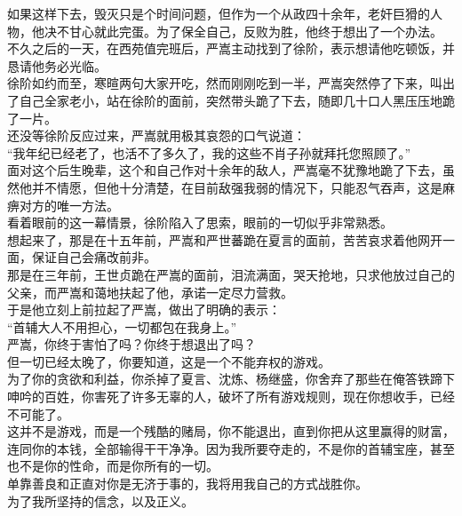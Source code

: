 \begin{multicols}{\theparacolNo}
如果这样下去，毁灭只是个时间问题，但作为一个从政四十余年，老奸巨猾的人物，他决不甘心就此完蛋。为了保全自己，反败为胜，他终于想出了一个办法。\\

不久之后的一天，在西苑值完班后，严嵩主动找到了徐阶，表示想请他吃顿饭，并恳请他务必光临。\\

徐阶如约而至，寒暄两句大家开吃，然而刚刚吃到一半，严嵩突然停了下来，叫出了自己全家老小，站在徐阶的面前，突然带头跪了下去，随即几十口人黑压压地跪了一片。\\

还没等徐阶反应过来，严嵩就用极其哀怨的口气说道：\\

“我年纪已经老了，也活不了多久了，我的这些不肖子孙就拜托您照顾了。”\\

面对这个后生晚辈，这个和自己作对十余年的敌人，严嵩毫不犹豫地跪了下去，虽然他并不情愿，但他十分清楚，在目前敌强我弱的情况下，只能忍气吞声，这是麻痹对方的唯一方法。\\

看着眼前的这一幕情景，徐阶陷入了思索，眼前的一切似乎非常熟悉。\\

想起来了，那是在十五年前，严嵩和严世蕃跪在夏言的面前，苦苦哀求着他网开一面，保证自己会痛改前非。\\

那是在三年前，王世贞跪在严嵩的面前，泪流满面，哭天抢地，只求他放过自己的父亲，而严嵩和蔼地扶起了他，承诺一定尽力营救。\\

于是他立刻上前拉起了严嵩，做出了明确的表示：\\

“首辅大人不用担心，一切都包在我身上。”\\

严嵩，你终于害怕了吗？你终于想退出了吗？\\

但一切已经太晚了，你要知道，这是一个不能弃权的游戏。\\

为了你的贪欲和利益，你杀掉了夏言、沈炼、杨继盛，你舍弃了那些在俺答铁蹄下呻吟的百姓，你害死了许多无辜的人，破坏了所有游戏规则，现在你想收手，已经不可能了。\\

这并不是游戏，而是一个残酷的赌局，你不能退出，直到你把从这里赢得的财富，连同你的本钱，全部输得干干净净。因为我所要夺走的，不是你的首辅宝座，甚至也不是你的性命，而是你所有的一切。\\

单靠善良和正直对你是无济于事的，我将用我自己的方式战胜你。\\

为了我所坚持的信念，以及正义。\\
\ifnum{}
	\end{multicols}
\fi
\newpage
